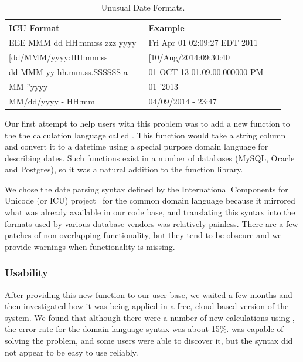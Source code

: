 \begin{table}[ht]
\centering
\begin{tabular}{|p{0.498\linewidth}| p{0.485\linewidth}|}
\hline
\centering
\textbf{ICU Format} & \textbf{Example}\\ \hline
\scriptsize{EEE MMM dd HH:mm:ss zzz yyyy} & \scriptsize{Fri Apr 01 02:09:27 EDT 2011}\\ \hline
\scriptsize{[dd/MMM/yyyy:HH:mm:ss} & \scriptsize{[10/Aug/2014:09:30:40}\\ \hline
\scriptsize{dd-MMM-yy hh.mm.ss.SSSSSS a} & \scriptsize{01-OCT-13 01.09.00.000000 PM}\\ \hline
\scriptsize{MM ''yyyy} & \scriptsize{01 '2013}\\ \hline
\scriptsize{MM/dd/yyyy - HH:mm} & \scriptsize{04/09/2014 - 23:47}\\ \hline
\end{tabular}
\label{tab:dateformats}
\caption{Unusual Date Formats.}
\end{table}


Our first attempt to help users with this problem was to add a new function to the the calculation language called \dateparse. This function would take a string column and convert it to a datetime using a special purpose domain language for describing dates. Such functions exist in a number of databases (\eg MySQL, Oracle and Postgres), so it was a natural addition to the function library.

We chose the date parsing syntax defined by the International Components for Unicode (or ICU) project~\cite{ICU} for the common domain language because it mirrored what was already available in our code base, and translating this syntax into the formats used by various database vendors was relatively painless. There are a few patches of non-overlapping functionality, but they tend to be obscure and we provide warnings when functionality is missing.

\subsubsection{	Usability}
After providing this new function to our user base, we waited a few months and then investigated how it was being applied in a free, cloud-based version of the system. We found that although there were a number of new calculations using \dateparse, the error rate for the domain language syntax was about 15\%. \dateparse was capable of solving the problem, and some users were able to discover it, but the syntax did not appear to be easy to use reliably.

